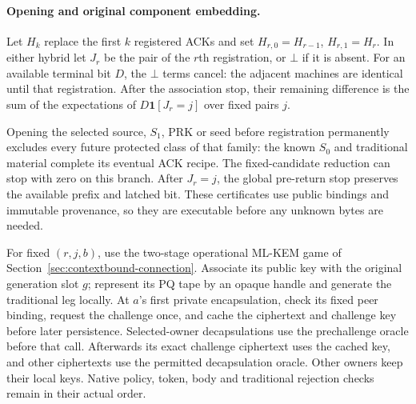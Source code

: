 \documentclass[pdflatex]{sn-jnl}
\theoremstyle{thmstyleone}
\theoremstyle{thmstylethree}
\theoremstyle{thmstyletwo}
\begin{document}
\paragraph{Opening and original component embedding.}
Let $H_k$ replace the first $k$ registered ACKs and set
$H_{r,0}=H_{r-1}$, $H_{r,1}=H_r$. In either hybrid let $J_r$ be
the pair of the $r$th registration, or $\bot$ if it is absent. For
an available terminal bit $D$, the $\bot$ terms cancel: the adjacent
machines are identical until that registration. After the association
stop, their remaining difference is the sum of the expectations of
$D\mathbf1[J_r=j]$ over fixed pairs $j$.

Opening the selected source, $S_1$, PRK or seed before registration
permanently excludes every future protected class of that family: the
known $S_0$ and traditional material complete its eventual ACK recipe.
The fixed-candidate reduction can stop with zero on this branch.
After $J_r=j$, the global pre-return stop preserves the available prefix
and latched bit. These certificates use public bindings and immutable
provenance, so they are executable before any unknown bytes are needed.

For fixed $(r,j,b)$, use the two-stage operational ML-KEM game of
Section~\ref{sec:contextbound-connection}. Associate its public key with
the original generation slot $g$; represent its PQ tape by an opaque handle
and generate the traditional leg locally. At $a$'s first private
encapsulation, check its fixed peer binding, request the challenge once,
and cache the ciphertext and challenge key before later persistence.
Selected-owner decapsulations use the prechallenge oracle before that
call. Afterwards its exact challenge ciphertext uses the cached key,
and other ciphertexts use the permitted decapsulation oracle. Other
owners keep their local keys. Native policy, token, body and traditional
rejection checks remain in their actual order.
\end{document}
